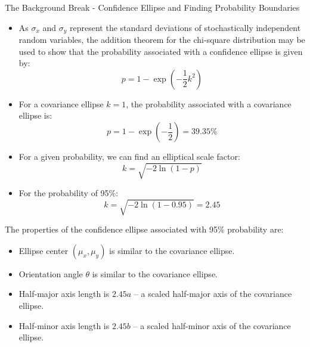 \begin{frame}{The Background Break - Confidence Ellipse and Finding Probability Boundaries}
   \begin{itemize} 
    \item As \(\sigma_x\) and \(\sigma_y\) represent the standard deviations of stochastically independent random variables, the addition theorem for the chi-square distribution may be used to show that the probability associated with a confidence ellipse is given by:
    $$p = 1 - \exp\left(-\frac{1}{2}k^2\right)$$
    \item For a covariance ellipse \(k = 1\), the probability associated with a covariance ellipse is:
    $$p = 1 - \exp\left(-\frac{1}{2}\right) = 39.35\%$$
    \item For a given probability, we can find an elliptical scale factor: $$k = \sqrt{-2\ln(1 - p)}$$
    \item For the probability of 95\%: $$k = \sqrt{-2\ln(1 - 0.95)} = 2.45$$
\end{itemize}

The properties of the confidence ellipse associated with 95\% probability are:
\begin{itemize}
    \item Ellipse center \((\mu_x, \mu_y)\) is similar to the covariance ellipse.
    \item Orientation angle \(\theta\) is similar to the covariance ellipse.
    \item Half-major axis length is \(2.45a\) – a scaled half-major axis of the covariance ellipse.
    \item Half-minor axis length is \(2.45b\) – a scaled half-minor axis of the covariance ellipse.
\end{itemize}
\end{frame}